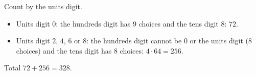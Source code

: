 Count by the units digit.
\begin{itemize}
\item Units digit $0$: the hundreds digit has $9$ choices and the tens digit $8$: $72$.
\item Units digit $2$, $4$, $6$ or $8$: the hundreds digit cannot be $0$ or the units digit ($8$ choices) and the tens digit has $8$ choices: $4\cdot64=256$.
\end{itemize}
Total $72+256=\boxed{328}$.

